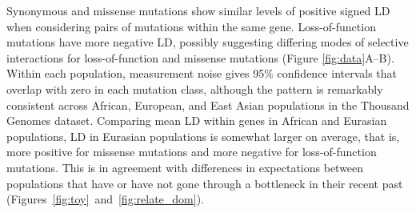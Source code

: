 \documentclass[]{article}
\begin{document}

Synonymous and missense mutations show similar levels of positive signed LD
when considering pairs of mutations within the same gene. Loss-of-function
mutations have more negative LD, possibly suggesting differing modes of
selective interactions for loss-of-function and missense mutations (Figure
\ref{fig:data}A--B). Within each population, measurement noise gives 95\%
confidence intervals that overlap with zero in each mutation class, although
the pattern is remarkably consistent across African, European, and East Asian
populations in the Thousand Genomes dataset. Comparing mean LD within genes in
African and Eurasian populations, LD in Eurasian populations is somewhat larger
on average, that is, more positive for missense mutations and more negative for
loss-of-function mutations. This is in agreement with differences in
expectations between populations that have or have not gone through a
bottleneck in their recent past
(Figures~\ref{fig:toy}~and~\ref{fig:relate_dom}).
\end{document}
